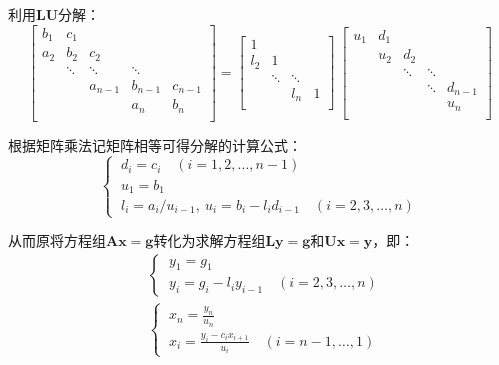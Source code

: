 利用$\boldsymbol{LU}$分解：
\begin{equation*}
    \begin{bmatrix}
        b_1 & c_1       & \       & \      & \       \\
        a_2 & b_2       & c_2     & \      & \       \\
        \   & \ddots    & \ddots  & \ddots & \       \\
        \   & \         & a_{n-1} & b_{n-1}& c_{n-1} \\
        \   & \         & \       & a_{n}  & b_{n}   \\
    \end{bmatrix} = 
    \begin{bmatrix}
        1 & \ & \ & \ \\
        l_2 & 1 & \ & \ \\
        \ & \ddots & \ddots &\ \\
        \ & \ & l_n & 1 \\
    \end{bmatrix}\ 
    \begin{bmatrix}
        u_1 & d_1 & \   & \  &\  \\
        \   & u_2 & d_2 & \  &\  \\
        \   & \   & \ddots & \ddots & \ \\
        \   & \   & \   & \ddots & d_{n-1} \\
        \   & \   & \   & \  & u_n \\
    \end{bmatrix}
\end{equation*}

根据矩阵乘法记矩阵相等可得分解的计算公式：
\begin{equation}\label{thomas1}
    \begin{cases}
        \ d_i = c_i \quad (i=1,2,\dots,n-1) \\
        \ u_1 = b_1 \\
        \ l_i = a_i / u_{i-1},\ u_i = b_i - l_i d_{i-1} \quad (i=2,3,\dots,n)
    \end{cases}
\end{equation}

从而原将方程组$\boldsymbol{Ax}=\boldsymbol{g}$转化为求解方程组$\boldsymbol{Ly}=\boldsymbol{g}$和$\boldsymbol{Ux}=\boldsymbol{y}$，即：
\begin{align}
    & \begin{cases}
        \ y_1 = g_1 \\
        \ y_i = g_i - l_i y_{i-1} \quad (i=2,3,\dots,n)
    \end{cases} \label{thomas2}\\
    & \begin{cases}
        \ x_n = {\displaystyle \frac{y_n}{u_n}} \\[3mm]
        \ x_i = {\displaystyle \frac{y_i - c_i x_{i+1}}{u_i}} \quad (i=n-1,\dots,1)
    \end{cases} \label{thomas3}
\end{align}

